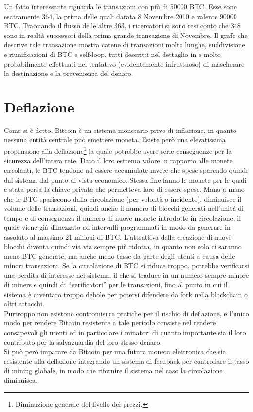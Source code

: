 Un fatto interessante riguarda le transazioni con più di 50000 BTC. Esse sono esattamente 364, la prima delle quali datata 8 Novembre 2010 e valente 90000 BTC. Tracciando il flusso delle altre 363, i ricercatori si sono resi conto che 348 sono in realtà successori della prima grande transazione di Novembre. Il grafo che descrive tale transazione mostra catene di transazioni molto lunghe, suddivisione e riunificazioni di BTC e self-loop, tutti descritti nel dettaglio in \cite{transazioni} e molto probabilmente effettuati nel tentativo (evidentemente infruttuoso) di mascherare la destinazione e la provenienza del denaro.

\section{Deflazione}\label{deflazione}

Come si è detto, Bitcoin è un sistema monetario privo di inflazione, in quanto nessuna entità centrale può emettere moneta.
Esiste però una elevatissima propensione alla deflazione\footnote{Diminuzione generale del livello dei prezzi.} la quale potrebbe avere serie conseguenze per la sicurezza dell'intera rete.
Dato il loro estremo valore in rapporto alle monete circolanti, le BTC tendono ad essere accumulate invece che spese sparendo quindi dal sistema dal punto di vista economico. Stessa fine fanno le monete per le quali è stata persa la chiave privata che permetteva loro di essere spese.
Mano a mano che le BTC spariscono dalla circolazione (per volontà o incidente), diminuisce il volume delle transazioni, quindi anche il numero di blocchi generati nell'unità di tempo e di conseguenza il numero di nuove monete introdotte in circolazione, il quale viene già dimezzato ad intervalli programmati in modo da generare in assoluto al massimo 21 milioni di BTC.
L'attrattiva della creazione di nuovi blocchi diventa quindi via via sempre più ridotta, in quanto non solo ci saranno meno BTC generate, ma anche meno tasse da parte degli utenti a causa delle minori transazioni.
Se la circolazione di BTC si riduce troppo, potrebbe verificarsi una perdita di interesse nel sistema, il che si traduce in un numero sempre minore di miners e quindi di ``verificatori'' per le transazioni, fino al punto in cui il sistema è diventato troppo debole per potersi difendere da fork nella blockchain o altri attacchi.\\
Purtroppo non esistono contromisure pratiche per il rischio di deflazione, e l'unico modo per rendere Bitcoin resistente a tale pericolo consiste nel rendere consapevoli gli utenti ed in particolare i minatori di quanto importante sia il loro contributo per la salvaguardia del loro stesso denaro.\\
Si può però imparare da Bitcoin per una futura moneta elettronica che sia resistente alla deflazione integrando un sistema di feedback per controllare il tasso di mining globale, in modo che rifornire il sistema nel caso la circolazione diminuisca.


